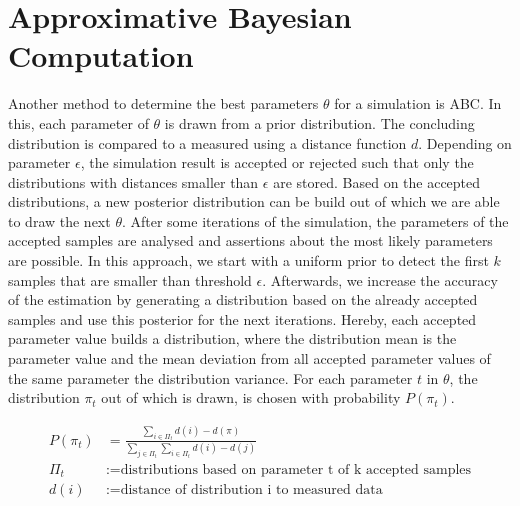 \section{Approximative Bayesian Computation}
\label{ABC}
Another method to determine the best parameters $\theta$ for a simulation is \acf{ABC}. In this, each parameter of $\theta$ is drawn from a prior distribution. The concluding distribution is compared to a measured using a distance function $d$. Depending on parameter $\epsilon$, the simulation result is accepted or rejected such that only the distributions with distances smaller than $\epsilon$ are stored. Based on the accepted distributions, a new posterior distribution can be build out of which we are able to draw the next $\theta$. After some iterations of the simulation, the parameters of the accepted samples are analysed and assertions about the most likely parameters are possible.\newline
In this approach, we start with a uniform prior to detect the first $k$ samples that are smaller than threshold $\epsilon$. Afterwards, we increase the accuracy of the estimation by generating a distribution based on the already accepted samples and use this posterior for the next iterations. Hereby, each accepted parameter value builds a distribution, where the distribution mean is the parameter value and the mean deviation from all accepted parameter values of the same parameter the distribution variance. For each parameter $t$ in $\theta$, the distribution $\pi_t$ out of which is drawn, is chosen with probability $P(\pi_t)$.\newline
\begin{center}
\begin{align*}
P(\pi_t) &= \frac{\sum_{i \in \Pi_t}{d(i)}-d(\pi)}{\sum_{j \in \Pi_t}{\sum_{i \in \Pi_t}{d(i)}-d(j)}}\\
\Pi_t &:= \text{distributions based on parameter t of k accepted samples}\\
d(i) &:= \text{distance of distribution i to measured data}
\end{align*}
\end{center}

